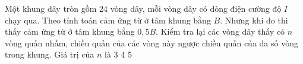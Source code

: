 \begin{ex}
	Một khung dây tròn gồm 24 vòng dây, mỗi vòng dây có dòng điện cường độ $I$ chạy qua. Theo tính toán cảm ứng từ ở tâm khung bằng $B$. Nhưng khi đo thì thấy cảm ứng từ ở tâm khung bằng $0,5B$. Kiểm tra lại các vòng dây thấy có $n$ vòng quấn nhầm, chiều quấn của các vòng này ngược chiều quấn của đa số vòng trong khung. Giá trị của $n$ là
	\choice
	{3}
	{4}
	{5}
	{}
\end{ex}

